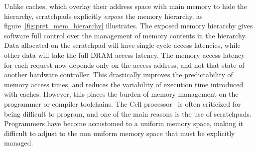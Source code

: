 Unlike caches, which overlay their address space with main memory to hide the hierarchy, scratchpads explicitly \emph{expose} the memory hierarchy, as figure~\ref{fig:pret_mem_hierarchy} illustrates.  
The exposed memory hierarchy gives software full control over the management of memory contents in the hierarchy.
Data allocated on the scratchpad will have single cycle access latencies, while other data will take the full DRAM access latency. 
The memory access latency for each request now depends only on the access address, and not that state of another hardware controller. 
This drastically improves the predictability of memory access times, and reduces the variability of execution time introduced with caches.
However, this places the burden of memory management on the programmer or compiler toolchains.  
The Cell processor~\cite{cellproc} is often criticized for being difficult to program, and one of the main reasons is the use of scratchpads. 
Programmers have become accustomed to a uniform memory space, making it difficult to adjust to the non uniform memory space that must be explicitly managed.


